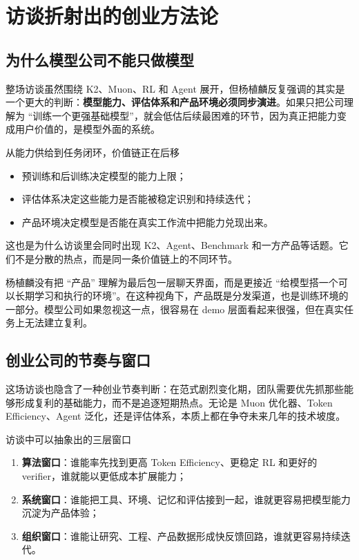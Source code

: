 \section{访谈折射出的创业方法论}

\subsection{为什么模型公司不能只做模型}
整场访谈虽然围绕 K2、Muon、RL 和 Agent 展开，但杨植麟反复强调的其实是一个更大的判断：\textbf{模型能力、评估体系和产品环境必须同步演进}。如果只把公司理解为 ``训练一个更强基础模型''，就会低估后续最困难的环节，因为真正把能力变成用户价值的，是模型外面的系统。

\begin{importantbox}{从能力供给到任务闭环，价值链正在后移}
\begin{itemize}
    \item 预训练和后训练决定模型的能力上限；
    \item 评估体系决定这些能力是否能被稳定识别和持续迭代；
    \item 产品环境决定模型是否能在真实工作流中把能力兑现出来。
\end{itemize}
这也是为什么访谈里会同时出现 K2、Agent、Benchmark 和一方产品等话题。它们不是分散的热点，而是同一条价值链上的不同环节。
\end{importantbox}

杨植麟没有把 ``产品'' 理解为最后包一层聊天界面，而是更接近 ``给模型搭一个可以长期学习和执行的环境''。在这种视角下，产品既是分发渠道，也是训练环境的一部分。模型公司如果忽视这一点，很容易在 demo 层面看起来很强，但在真实任务上无法建立复利。

\subsection{创业公司的节奏与窗口}
这场访谈也隐含了一种创业节奏判断：在范式剧烈变化期，团队需要优先抓那些能够形成复利的基础能力，而不是追逐短期热点。无论是 Muon 优化器、Token Efficiency、Agent 泛化，还是评估体系，本质上都在争夺未来几年的技术坡度。

\begin{knowledgebox}{访谈中可以抽象出的三层窗口}
\begin{enumerate}
    \item \textbf{算法窗口}：谁能率先找到更高 Token Efficiency、更稳定 RL 和更好的 verifier，谁就能以更低成本扩展能力；
    \item \textbf{系统窗口}：谁能把工具、环境、记忆和评估接到一起，谁就更容易把模型能力沉淀为产品体验；
    \item \textbf{组织窗口}：谁能让研究、工程、产品数据形成快反馈回路，谁就更容易持续迭代。
\end{enumerate}
\end{knowledgebox}

